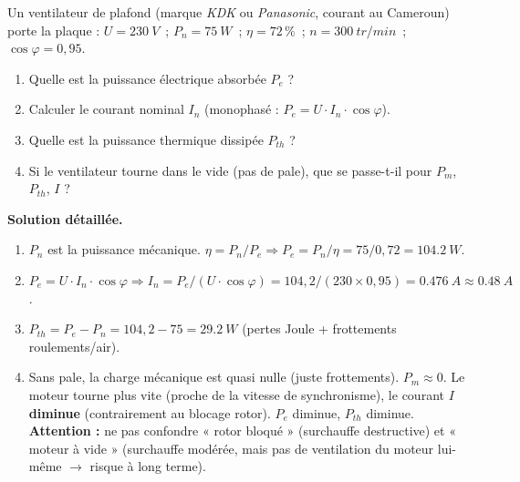 \documentclass[11pt]{article}
\begin{document}
\begin{exoresolu}
Un ventilateur de plafond (marque \emph{KDK} ou \emph{Panasonic}, courant au Cameroun) porte la plaque : $U = \SI{230}{V}$~; $P_n = \SI{75}{W}$~; $\eta = 72\,\%$~; $n = \SI{300}{tr/min}$~; $\cos\varphi = 0,95$.
\begin{enumerate}
\item Quelle est la puissance électrique absorbée $P_e$ ?
\item Calculer le courant nominal $I_n$ (monophasé : $P_e = U \cdot I_n \cdot \cos\varphi$).
\item Quelle est la puissance thermique dissipée $P_{th}$ ?
\item Si le ventilateur tourne dans le vide (pas de pale), que se passe-t-il pour $P_m$, $P_{th}$, $I$ ?
\end{enumerate}
\tcblower
\textbf{Solution détaillée.}
\begin{enumerate}
\item $P_n$ est la puissance mécanique. $\eta = P_n / P_e \Rightarrow P_e = P_n / \eta = 75 / 0,72 = \SI{104,2}{W}$.
\item $P_e = U \cdot I_n \cdot \cos\varphi \Rightarrow I_n = P_e / (U \cdot \cos\varphi) = 104,2 / (230 \times 0,95) = \SI{0,476}{A} \approx \SI{0,48}{A}$.
\item $P_{th} = P_e - P_n = 104,2 - 75 = \SI{29,2}{W}$ (pertes Joule + frottements roulements/air).
\item Sans pale, la charge mécanique est quasi nulle (juste frottements). $P_m \approx 0$. Le moteur tourne plus vite (proche de la vitesse de synchronisme), le courant $I$ \textbf{diminue} (contrairement au blocage rotor). $P_e$ diminue, $P_{th}$ diminue. \textbf{Attention :} ne pas confondre « rotor bloqué » (surchauffe destructive) et « moteur à vide » (surchauffe modérée, mais pas de ventilation du moteur lui-même $\rightarrow$ risque à long terme).
\end{enumerate}
\end{exoresolu}
\end{document}

